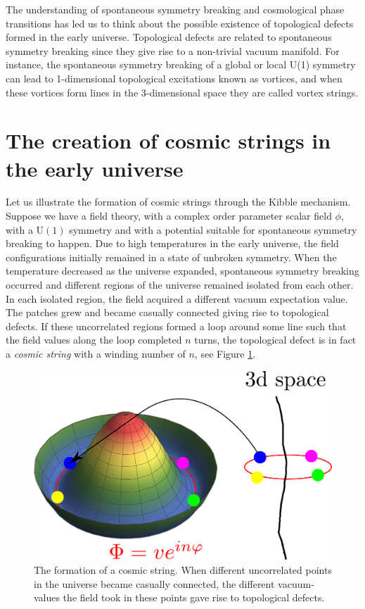 The understanding of spontaneous symmetry breaking and cosmological phase transitions has led us to think about the possible existence of topological defects formed in the early universe. Topological defects are related to spontaneous symmetry breaking since they give rise to a non-trivial vacuum manifold. For instance, the spontaneous symmetry breaking of a global or local U(1) symmetry can lead to 1-dimensional topological excitations known as vortices, and when these vortices form lines in the 3-dimensional space they are called vortex strings. 
 
\section{The creation of cosmic strings in the early universe} 
Let us illustrate the formation of cosmic strings through the Kibble mech\-an\-ism. Suppose we have a field theory, with a complex order parameter scalar field $\phi$, with a $\text{U}(1)$ symmetry and with a potential suitable for spontaneous symmetry breaking to happen. Due to high temperatures in the early universe, the field con\-fig\-u\-ra\-tions initially remained in a state of unbroken symmetry. When the temperature decreased as the universe expanded, spontaneous symmetry breaking occurred and different regions of the universe remained isolated from each other. In each isolated region, the field acquired a different vacuum expectation value. The patches grew and became casually connected giving rise to topological defects. If these uncorrelated regions formed a loop around some line such that the field values along the loop completed $n$ turns, the topological defect is in fact a \textit{cosmic string} with a winding number of $n$, see Figure \ref{fig:higgspotential}. %
\begin{figure}
	\centering
	\includegraphics[scale=0.65]{./figures/higgspot.pdf}
	\caption{The formation of a cosmic string. When different uncorrelated points in the universe became casually connected, the different vacuum-values the field took in these points gave rise to topological defects.}
	\label{fig:higgspotential}
\end{figure} 
